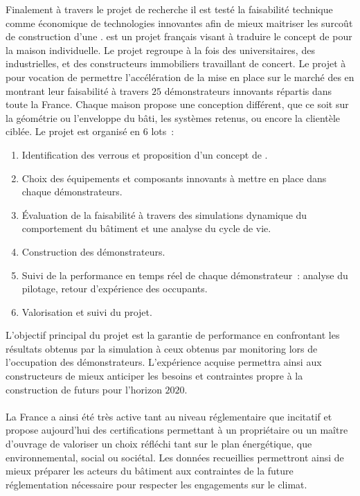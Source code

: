 Finalement à travers le projet de recherche  il est testé la faisabilité
technique comme économique de technologies innovantes afin de mieux maitriser les surcoût
de construction d’une .  est un projet français visant à traduire
le concept de  pour la maison individuelle. Le projet regroupe à la fois des
universitaires, des industrielles, et des constructeurs immobiliers travaillant de
concert. Le projet à pour vocation de permettre l’accélération de la mise en place sur le
marché des  en montrant leur faisabilité à travers $25$ démonstrateurs
innovants répartis dans toute la France. Chaque maison propose une conception différent,
que ce soit sur la géométrie ou l’enveloppe du bâti, les systèmes retenus, ou encore la
clientèle ciblée. Le projet est organisé en $6$ lots~:
\begin{enumerate}
  \item Identification des verrous et proposition d’un concept de .
  \item Choix des équipements et composants innovants à mettre en place dans chaque
        démonstrateurs.
  \item Évaluation de la faisabilité à travers des simulations dynamique du comportement
        du bâtiment et une analyse du cycle de vie.
  \item Construction des démonstrateurs.
  \item Suivi de la performance en temps réel de chaque démonstrateur~: analyse du pilotage,
        retour d’expérience des occupants.
  \item Valorisation et suivi du projet.
\end{enumerate}
L’objectif principal du projet est la garantie de performance en confrontant les résultats
obtenus par la simulation à ceux obtenus par monitoring lors de l’occupation des
démonstrateurs. L’expérience acquise permettra ainsi aux constructeurs de mieux anticiper
les besoins et contraintes propre à la construction de futurs  pour l’horizon
$2020$.

\paragraph{} %
La France a ainsi été très active tant au niveau réglementaire que incitatif et propose
aujourd’hui des certifications permettant à un propriétaire ou un maître d’ouvrage de
valoriser un choix réfléchi tant sur le plan énergétique, que environnemental, social ou
sociétal. Les données recueillies permettront ainsi de mieux préparer les acteurs
du bâtiment aux contraintes de la future réglementation nécessaire pour respecter les engagements sur le climat.


